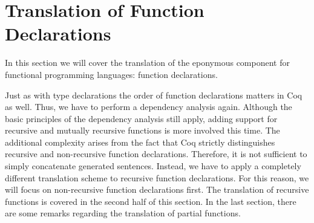 \section{Translation of Function Declarations} \label{sec:translation:func-decl}
In this section we will cover the translation of the eponymous component for functional programming languages: function declarations.

Just as with type declarations the order of function declarations matters in Coq as well.
Thus, we have to perform a dependency analysis again.
Although the basic principles of the dependency analysis still apply, adding support for recursive and mutually recursive functions is more involved this time.
The additional complexity arises from the fact that Coq strictly distinguishes recursive and non-recursive function declarations.
Therefore, it is not sufficient to simply concatenate generated sentences.
Instead, we have to apply a completely different translation scheme to recursive function declarations.
For this reason, we will focus on non-recursive function declarations first.
The translation of recursive functions is covered in the second half of this section.
In the last section, there are some remarks regarding the translation of partial functions.

